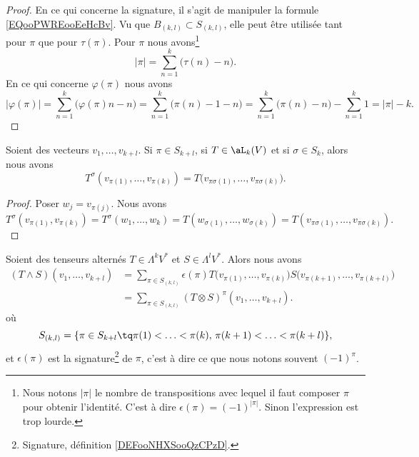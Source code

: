 \begin{proof}
	En ce qui concerne la signature, il s'agit de manipuler la formule \eqref{EQooPWREooEeHcBv}. Vu que \( B_{(k,l)}\subset S_{(k,l)}\), elle peut être utilisée tant pour \( \pi\) que pour \( \tau(\pi)\). Pour \( \pi\) nous avons\footnote{Nous notons \( | \pi |\) le nombre de transpositions avec lequel il faut composer \( \pi\) pour obtenir l'identité. C'est à dire \( \epsilon(\pi)=(-1)^{| \pi |}\). Sinon l'expression est trop lourde.}
	\begin{equation}
		| \pi |=\sum_{n=1}^k\big( \tau(n)-n \big).
	\end{equation}
	En ce qui concerne \( \varphi(\pi)\) nous avons
	\begin{equation}
		| \varphi(\pi) |=\sum_{n=1}^k\big( \varphi(\pi)n-n \big)=\sum_{n=1}^k\big( \pi(n)-1-n \big)=\sum_{n=1}^k\big( \pi(n)-n \big)-\sum_{n=1}^k1=| \pi |-k.
	\end{equation}
\end{proof}

\begin{lemma}		\label{LEMooRKWHooBNxZBL}
	Soient des vecteurs \( v_1,\ldots,v_{k+l}\). Si \(\pi \in S_{k+l} \), si \( T\in \aL_k(V)\) et si \( \sigma\in S_k\), alors nous avons
	\begin{equation}		\label{EQooQJXHooTfvclD}
		T^{\sigma}(v_{\pi(1)},\ldots,v_{\pi(k)})=T\big( v_{\pi\sigma(1)},\ldots,v_{\pi\sigma(k)} \big).
	\end{equation}
\end{lemma}

\begin{proof}
	Poser \( w_j=v_{\pi(j)}\). Nous avons
	\begin{equation}
		T^{\sigma}(v_{\pi(1)}, v_{\pi(k)})=T^{\sigma}(w_1,\ldots,w_k)=T(w_{\sigma(1)},\ldots,w_{\sigma(k)})=T(v_{\pi\sigma(1)},\ldots,v_{\pi\sigma(k)}).
	\end{equation}
\end{proof}

\begin{lemma}		\label{LEMooTGNUooZnxkrc}
	Soient des tenseurs alternés \( T\in\Lambda^kV^*\) et \( S\in \Lambda^lV^*\). Alors nous avons
	\begin{subequations}
		\begin{align}
			(T\wedge S)(v_1,\ldots, v_{k+l}) & =\sum_{\pi\in S_{(k,l)}}\epsilon(\pi)T\big( v_{\pi(1)},\ldots,v_{\pi(k)} \big)S\big( v_{\pi(k+1)},\ldots, v_{\pi(k+l)} \big) \\
			                                 & =\sum_{\pi\in S_{(k,l)}}(T\otimes S)^{\pi}(v_1,\ldots,v_{k+l}).		\label{SUBEQooUDLIooWwGFoe}
		\end{align}
	\end{subequations}
	où
	\begin{equation}
		S_{(k,l)}=\{ \pi\in S_{k+l}\tq \pi(1)<\ldots <\pi(k),\,\pi(k+1)<\ldots <\pi(k+l) \},
	\end{equation}
	et \( \epsilon(\pi)\) est la signature\footnote{Signature, définition \ref{DEFooNHXSooQzCPzD}.} de \( \pi\), c'est à dire ce que nous notons souvent \( (-1)^{\pi}\).
\end{lemma}

